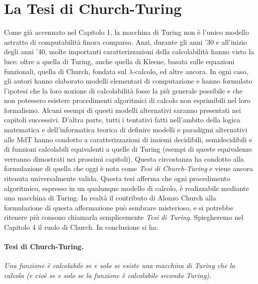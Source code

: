 \section{La Tesi di Church-Turing}

Come già accennato nel Capitolo 1, la macchina di Turing non è l'unico modello
astratto di computabilità finora comparso. Anzi, durante gli anni '30 e all'inizio
degli anni '40, molte importanti caratterizzazioni della calcolabilità hanno visto la
luce: oltre a quella di Turing, anche quella di Kleene, basata sulle equazioni
funzionali, quella di Church, fondata sul $\lambda$-calcolo, ed altre ancora. In ogni caso,
gli autori hanno elaborato modelli elementari di computazione e hanno formulato
l'ipotesi che la loro nozione di calcolabilità fosse la più generale possibile e che
non potessero esistere procedimenti algoritmici di calcolo non esprimibili nel loro
formalismo. Alcuni esempi di questi modelli alternativi saranno presentati nei
capitoli successivi. D'altra parte, tutti i tentativi fatti nell'ambito della logica
matematica e dell'informatica teorica di definire modelli e paradigmi alternativi
alle MdT hanno condotto a caratterizzazioni di insiemi decidibili, semidecidibili e
di funzioni calcolabili equivalenti a quelle di Turing (esempi di queste equivalenze
verranno dimostrati nei prossimi capitoli). Questa circostanza ha condotto alla
formulazione di quella che oggi è nota come \textit{Tesi di Church-Turing} e viene ancora
ritenuta universalmente valida. Questa tesi afferma che ogni procedimento
algoritmico, espresso in un qualunque modello di calcolo, è realizzabile mediante una
macchina di Turing. In realtà il contributo di Alonzo Church alla formulazione di
questa affermazione può sembrare misterioso, e si potrebbe ritenere più consono
chiamarla semplicemente \textit{Tesi di Turing}. Spiegheremo nel Capitolo 4 il ruolo di
Church. In conclusione si ha:

\paragraph{Tesi di Church-Turing.} \textit{Una funzione è calcolabile se e solo se
    esiste una macchina di Turing che la calcola (e cioè se e solo se la funzione è
    calcolabile secondo Turing).}\\

